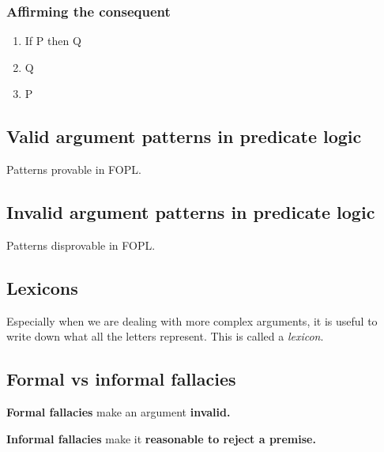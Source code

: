 \subsubsection{Affirming the consequent}

\begin{enumerate}
    \item If P then Q
    \item Q
    \item P
\end{enumerate}

\subsection{Valid argument patterns in predicate logic}

Patterns provable in FOPL.

\subsection{Invalid argument patterns in predicate logic}

Patterns disprovable in FOPL.

\subsection{Lexicons}

Especially when we are dealing with more complex arguments, it is useful to
write down what all the letters represent. This is called a \textit{lexicon}.

\subsection{Formal vs informal fallacies}

\textbf{Formal fallacies} make an argument \textbf{invalid.}

\textbf{Informal fallacies} make it \textbf{reasonable to reject a premise.}


